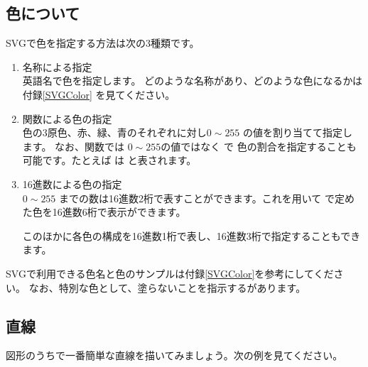 \subsection{色について}\label{howtoindicatecolor}
SVGで色を指定する方法は次の3種類です。
\begin{enumerate}
 \item 名称による指定\\英語名で色を指定します。
 どのような名称があり、どのような色になるかは
付録\ref{SVGColor}
を見てください。
 \item {}関数による色の指定\\
色の3原色、赤、緑、青のそれぞれに対し$0\sim255$ の値を割り当てて指定し
       ます。%
%
なお、関数では $0\sim255$の値ではなく \Showattrib{\%}で
       色の割合を指定することも可能です。たとえば  は
        と表されます。
 \item 16進数による色の指定\\
$0\sim255$ までの数は16進数2桁で表すことができます。これを用いて
       で定めた色を16進数6桁で表示ができます。
 
このほかに各色の構成を16進数1桁で表し、16進数3桁で指定することもできます。
\end{enumerate}
SVGで利用できる色名と色のサンプルは付録\ref{SVGColor}を参考にしてくださ
       い。
なお、特別な色として、塗らないことを指示するがあります。
\subsection{直線}
図形のうちで一番簡単な直線を描いてみましょう。次の例を見てください。

